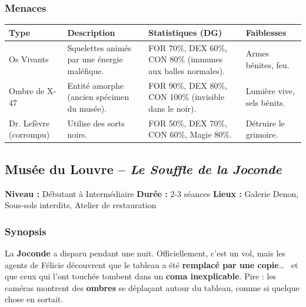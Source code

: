 \documentclass[10pt,a5paper,twoside]{book}
\begin{document}
\subsubsection*{Menaces}
\begin{center}
	\begin{tabular}{|P{2cm}|P{3cm}|P{3.5cm}|P{2.5cm}|}
	\hline
	\textbf{Type} 			& \textbf{Description} 							& \textbf{Statistiques (DG)} 									& \textbf{Faiblesses} \\ \hline
	Os Vivants 				& Squelettes animés par une énergie maléfique. 	& FOR 70\%, DEX 60\%, CON 80\% (immunes aux balles normales). 	& Armes bénites, feu. \\ \hline
	Ombre de X-47 			& Entité amorphe (ancien spécimen du musée). 	& FOR 90\%, DEX 80\%, CON 100\% (invisible dans le noir). 		& Lumière vive, sels bénits. \\ \hline
	Dr. Lefèvre (corrompu) 	& Utilise des sorts noirs. 						& FOR 50\%, DEX 70\%, CON 60\%, Magie 80\%. 					& Détruire le grimoire. \\ \hline
	\end{tabular}
\end{center}

\newpage

\subsection{Musée du Louvre -- \textit{Le Souffle de la Joconde}}


\begin{shaded}
	\textbf{Niveau :} Débutant à Intermédiaire \quad
	\textbf{Durée :} 2-3 séances \quad
	\textbf{Lieux :} Galerie Denon, Sous-sols interdits, Atelier de restauration
\end{shaded}

\subsubsection*{Synopsis}
La \textbf{Joconde} a disparu pendant une nuit. Officiellement, c'est un vol, mais les agents de Félicie découvrent que le tableau a été \textbf{remplacé par une copie}\ldots~  et que ceux qui l'ont touchée tombent dans un \textbf{coma inexplicable}. Pire : les caméras montrent des \textbf{ombres} se déplaçant autour du tableau, comme si quelque chose en sortait.
\end{document}
